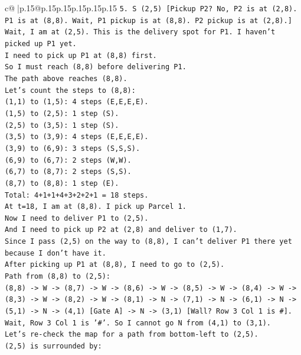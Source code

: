 \documentclass{article}
\begin{document}
{\begin{supertabular}{c@{$\;$}|p{.15\linewidth}@{}p{.15\linewidth}p{.15\linewidth}p{.15\linewidth}p{.15\linewidth}p{.15\linewidth}}
{{{\texttt{5. S (2,5) {[}Pickup P2? No, P2 is at (2,8). P1 is at (8,8). Wait, P1 pickup is at (8,8). P2 pickup is at (2,8).{]}} \\
\texttt{Wait, I am at (2,5). This is the delivery spot for P1. I haven't picked up P1 yet.} \\
\texttt{I need to pick up P1 at (8,8) first.} \\
\texttt{So I must reach (8,8) before delivering P1.} \\
\texttt{The path above reaches (8,8).} \\
\texttt{Let's count the steps to (8,8):} \\
\texttt{(1,1) to (1,5): 4 steps (E,E,E,E).} \\
\texttt{(1,5) to (2,5): 1 step (S).} \\
\texttt{(2,5) to (3,5): 1 step (S).} \\
\texttt{(3,5) to (3,9): 4 steps (E,E,E,E).} \\
\texttt{(3,9) to (6,9): 3 steps (S,S,S).} \\
\texttt{(6,9) to (6,7): 2 steps (W,W).} \\
\texttt{(6,7) to (8,7): 2 steps (S,S).} \\
\texttt{(8,7) to (8,8): 1 step (E).} \\
\texttt{Total: 4+1+1+4+3+2+2+1 = 18 steps.} \\
\texttt{At t=18, I am at (8,8). I pick up Parcel 1.} \\
\texttt{Now I need to deliver P1 to (2,5).} \\
\texttt{And I need to pick up P2 at (2,8) and deliver to (1,7).} \\
\texttt{Since I pass (2,5) on the way to (8,8), I can't deliver P1 there yet because I don't have it.} \\
\texttt{After picking up P1 at (8,8), I need to go to (2,5).} \\
\texttt{Path from (8,8) to (2,5):} \\
\texttt{(8,8) {-}> W {-}> (8,7) {-}> W {-}> (8,6) {-}> W {-}> (8,5) {-}> W {-}> (8,4) {-}> W {-}> (8,3) {-}> W {-}> (8,2) {-}> W {-}> (8,1) {-}> N {-}> (7,1) {-}> N {-}> (6,1) {-}> N {-}> (5,1) {-}> N {-}> (4,1) {[}Gate A{]} {-}> N {-}> (3,1) {[}Wall? Row 3 Col 1 is \#{]}.} \\
\texttt{Wait, Row 3 Col 1 is '\#'. So I cannot go N from (4,1) to (3,1).} \\
\texttt{Let's re{-}check the map for a path from bottom{-}left to (2,5).} \\
\texttt{(2,5) is surrounded by:} \\
}}}
\end{supertabular}}
\end{document}
